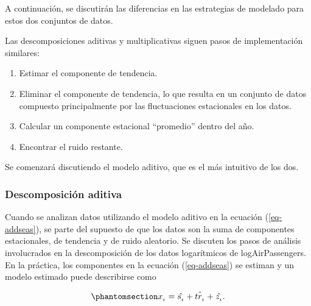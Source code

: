 \documentclass[
  us-letterpaper,
]{scrreprt}
\providecommand{\tightlist}{%
  \setlength{\itemsep}{0pt}\setlength{\parskip}{0pt}}\usepackage{longtable,booktabs,array}
\theoremstyle{plain}
\theoremstyle{definition}
\theoremstyle{definition}
\theoremstyle{plain}
\theoremstyle{remark}
\begin{document}
A continuación, se discutirán las diferencias en las estrategias de
modelado para estos dos conjuntos de datos.

Las descomposiciones aditivas y multiplicativas siguen pasos de
implementación similares:

\begin{enumerate}
\def\labelenumi{\arabic{enumi}.}
\tightlist
\item
  Estimar el componente de tendencia.
\item
  Eliminar el componente de tendencia, lo que resulta en un conjunto de
  datos compuesto principalmente por las fluctuaciones estacionales en
  los datos.
\item
  Calcular un componente estacional ``promedio'' dentro del año.
\item
  Encontrar el ruido restante.
\end{enumerate}

Se comenzará discutiendo el modelo aditivo, que es el más intuitivo de
los dos.

\subsubsection{Descomposición aditiva}\label{descomposiciuxf3n-aditiva}

Cuando se analizan datos utilizando el modelo aditivo en la ecuación
(\ref{eq-addseas}), se parte del supuesto de que los datos son la suma
de componentes estacionales, de tendencia y de ruido aleatorio. Se
discuten los pasos de análisis involucrados en la descomposición de los
datos logarítmicos de logAirPassengers. En la práctica, los componentes
en la ecuación (\ref{eq-addseas}) se estiman y un modelo estimado puede
describirse como

\begin{equation}\phantomsection\label{eq-addecompose}{
x_{_t}=\hat{s_{_t}}+\hat{tr_{_t}}+\hat{z_{_t}}.
}\end{equation}
\end{document}
